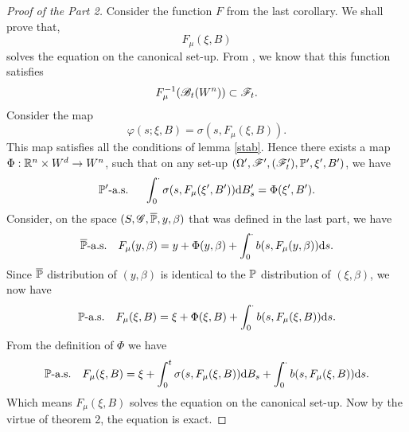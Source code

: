 \documentclass[8pt,onesided]{article}
\begin{document}
\begin{proof}
[Proof of the Part 2]
Consider the function $F$ from the last corollary. We shall prove that,
\begin{equation*}
    F_{\mu}(\xi,B)
\end{equation*}
solves the equation on the canonical set-up. From \cite[Lemma 17.9]{rogers2000diffusions2}, we know that this function satisfies
\begin{equation*}
    F_{\mu}^{-1}( \mathscr{B}_t(W^n))\subset\mathscr{F}_t.
\end{equation*}
Consider the map
\begin{equation*}
\varphi(s;\xi,B)= \sigma(s,F_\mu(\xi,B)).
\end{equation*}
This map satisfies all the conditions of lemma \ref{stab}. Hence there exists a map $\Phi: \mathbb{R}^n \times W^d\to W^n$, such that on any set-up $(\Omega',\mathscr{F}',(\mathscr{F}_t'), \mathbb{P}',\xi',B')$, we have
\begin{equation*}
    \mathbb{P}'\text{-a.s. }\quad \int_0^{\cdot} \sigma(s,F_{\mu}(\xi',B'))\dd B'_s=\Phi(\xi',B'). 
\end{equation*}
Consider, on the space $(S,\mathscr{G},\overline{\mathbb{P}},y,\beta)$ that was defined in the last part, we have
\begin{equation*}
    \overline{\mathbb{P}}\text{-a.s.}\quad F_\mu(y,\beta)=y+\Phi(y,\beta)+\int_0^{\cdot} b(s,F_{\mu}(y,\beta))\dd s.
\end{equation*}
Since $\overline{\mathbb{P}}$ distribution of $(y,\beta)$ is identical to the $\mathbb{P}$ distribution of $(\xi,\beta)$, we now have
\begin{equation*}
    \mathbb{P}\text{-a.s.} \quad F_{\mu}(\xi,B)=\xi+\Phi(\xi,B)+\int_0^{\cdot}b(s,F_{\mu}(\xi,B))\dd s.
\end{equation*}
From the definition of $\Phi$ we have
\begin{equation*}
    \mathbb{P}\text{-a.s.} \quad F_{\mu}(\xi,B)=\xi+\int_0^t \sigma(s,F_\mu(\xi,B))\dd B_s+\int_0^{\cdot}b(s,F_{\mu}(\xi,B))\dd s.
\end{equation*}
Which means $F_{\mu}(\xi,B)$ solves the equation on the canonical set-up. Now by the virtue of theorem 2, the equation is exact.

\end{proof}


\end{document}
